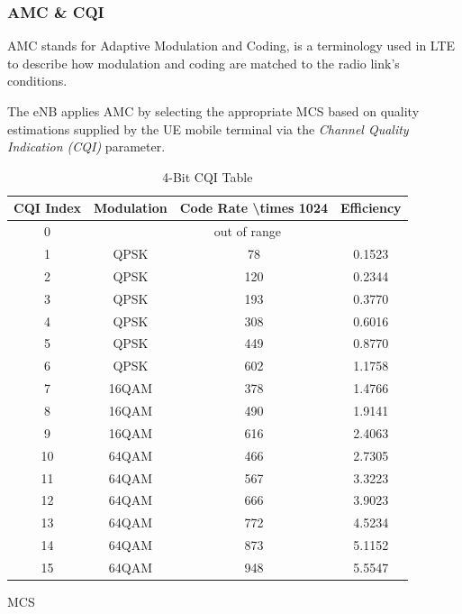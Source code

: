 \subsubsection{AMC \& CQI}
AMC stands for Adaptive Modulation and Coding, is a terminology used in LTE
to describe how modulation and coding are matched to the radio link's conditions.

The eNB applies AMC by selecting the appropriate MCS based on quality estimations supplied 
by the UE mobile terminal via the \textit{Channel Quality Indication (CQI)} parameter.

\renewcommand{\arraystretch}{1}

\begin{table}[h]
  \centering

  \begin{tabular}{@{}cccc@{}}
  \toprule
  CQI Index & Modulation & Code Rate \textbackslash{}times 1024 & Efficiency \\ \midrule
  0         & \multicolumn{3}{c}{out of range}                               \\
  1         & QPSK       & 78                                   & 0.1523     \\
  2         & QPSK       & 120                                  & 0.2344     \\
  3         & QPSK       & 193                                  & 0.3770     \\
  4         & QPSK       & 308                                  & 0.6016     \\
  5         & QPSK       & 449                                  & 0.8770     \\
  6         & QPSK       & 602                                  & 1.1758     \\
  7         & 16QAM      & 378                                  & 1.4766     \\
  8         & 16QAM      & 490                                  & 1.9141     \\
  9         & 16QAM      & 616                                  & 2.4063     \\
  10        & 64QAM      & 466                                  & 2.7305     \\
  11        & 64QAM      & 567                                  & 3.3223     \\
  12        & 64QAM      & 666                                  & 3.9023     \\
  13        & 64QAM      & 772                                  & 4.5234     \\
  14        & 64QAM      & 873                                  & 5.1152     \\
  15        & 64QAM      & 948                                  & 5.5547     \\ \bottomrule
  \end{tabular}
  \caption{4-Bit CQI Table}
\end{table}
MCS

